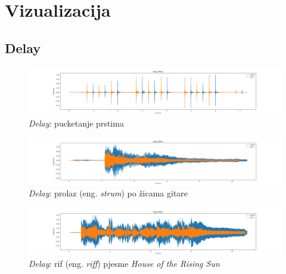 \documentclass[times, utf8, seminar, numeric]{fer}
\begin{document}
\pagebreak
\section{Vizualizacija}
\subsection{Delay}
\begin{figure}[!htb]
	\centerline{\includegraphics[width=1.75\textwidth]{delay_finger-snapping.png}}
	\caption{\textit{Delay}: pucketanje prstima}
	\label{fig}
\end{figure}
\begin{figure}[!htb]
	\centerline{\includegraphics[width=1.75\textwidth]{delay_strum.png}}
	\caption{\textit{Delay}: prolaz (eng. \textit{strum}) po žicama gitare}
	\label{fig}
\end{figure}
\begin{figure}[!htb]
	\centerline{\includegraphics[width=1.75\textwidth]{delay_rising-sun.png}}
	\caption{\textit{Delay}: rif (eng. \textit{riff}) pjesme \textit{House of the Rising Sun}}
	\label{fig}
\end{figure}

\pagebreak
\end{document}
